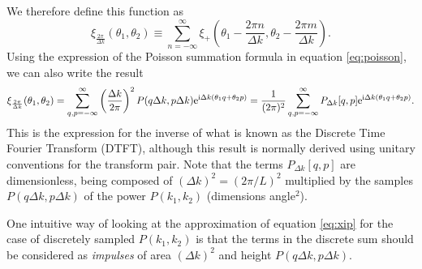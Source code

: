 \documentclass[preprint]{aastex}
\newcommand{\mi}{{\rm i}}
\newcommand{\me}{{\rm e}}
\begin{document}
We therefore define this function as
\begin{equation}
\xi_{\frac{2\pi}{\Delta k}}(\theta_1, \theta_2) \equiv \sum_{n = -\infty}^{\infty} \xi_+\left(\theta_1
- \frac{2 \pi n}{\Delta k},  \theta_2
- \frac{2 \pi m}{\Delta k} \right).
\end{equation}
Using the expression of the Poisson summation formula in equation
\eqref{eq:poisson}, we can also write the result
\begin{equation}
\xi_{\frac{2\pi}{\Delta k}}(\theta_1, \theta_2) =
\sum_{q,p=-\infty}^{\infty} \left( \frac{\Delta k}{2 \pi} \right)^2 P(q \Delta k, p \Delta k) \me^{\mi \Delta
  k (\theta_1 q + \theta_2 p)} = \frac{1}{( 2 \pi)^2}
\sum_{q,p=-\infty}^{\infty} P_{\Delta k} [q, p] \me^{\mi \Delta
  k (\theta_1 q + \theta_2 p)} \label{eq:dtft} .
\end{equation}
This is the expression for the inverse of what is known as the
Discrete Time Fourier Transform (DTFT), although this result is
normally derived using unitary conventions for the transform pair.
Note that the terms $P_{\Delta k}[q, p]$ are dimensionless, being
composed of $(\Delta k)^2 = (2 \pi / L)^2$ multiplied by the samples $P(q \Delta k, p \Delta
k)$ of the power $P(k_1, k_2)$ (dimensions angle$^2$).  

One intuitive way of looking at the approximation of equation \eqref{eq:xip} for the case of discretely
sampled $P(k_1, k_2)$ is that the terms in the discrete sum should be
considered as \emph{impulses} of area $(\Delta k)^2$ and height $P(q \Delta k, p \Delta k)$.
\end{document}
